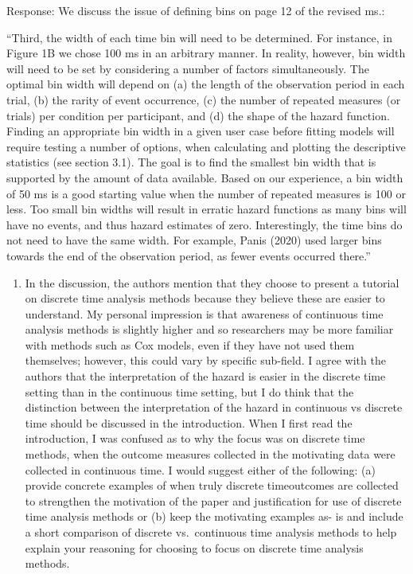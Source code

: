 \documentclass[
]{article}
\providecommand{\tightlist}{%
  \setlength{\itemsep}{0pt}\setlength{\parskip}{0pt}}
\renewenvironment{quote}{\begin{leftbar}}{\end{leftbar}}
\begin{document}
Response: We discuss the issue of defining bins on page 12 of the
revised ms.:

``Third, the width of each time bin will need to be determined. For
instance, in Figure 1B we chose 100 ms in an arbitrary manner. In
reality, however, bin width will need to be set by considering a number
of factors simultaneously. The optimal bin width will depend on (a) the
length of the observation period in each trial, (b) the rarity of event
occurrence, (c) the number of repeated measures (or trials) per
condition per participant, and (d) the shape of the hazard function.
Finding an appropriate bin width in a given user case before fitting
models will require testing a number of options, when calculating and
plotting the descriptive statistics (see section 3.1). The goal is to
find the smallest bin width that is supported by the amount of data
available. Based on our experience, a bin width of 50 ms is a good
starting value when the number of repeated measures is 100 or less. Too
small bin widths will result in erratic hazard functions as many bins
will have no events, and thus hazard estimates of zero. Interestingly,
the time bins do not need to have the same width. For example, Panis
(2020) used larger bins towards the end of the observation period, as
fewer events occurred there.''

\begin{quote}
\begin{enumerate}
\def\labelenumi{\arabic{enumi}.}
\setcounter{enumi}{1}
\tightlist
\item
  In the discussion, the authors mention that they choose to present a
  tutorial on discrete time analysis methods because they believe these
  are easier to understand. My personal impression is that awareness of
  continuous time analysis methods is slightly higher and so researchers
  may be more familiar with methods such as Cox models, even if they
  have not used them themselves; however, this could vary by specific
  sub-field. I agree with the authors that the interpretation of the
  hazard is easier in the discrete time setting than in the continuous
  time setting, but I do think that the distinction between the
  interpretation of the hazard in continuous vs discrete time should be
  discussed in the introduction. When I first read the introduction, I
  was confused as to why the focus was on discrete time methods, when
  the outcome measures collected in the motivating data were collected
  in continuous time. I would suggest either of the following: (a)
  provide concrete examples of when truly discrete timeoutcomes are
  collected to strengthen the motivation of the paper and justification
  for use of discrete time analysis methods or (b) keep the motivating
  examples as- is and include a short comparison of discrete
  vs.~continuous time analysis methods to help explain your reasoning
  for choosing to focus on discrete time analysis methods.
\end{enumerate}
\end{quote}
\end{document}
